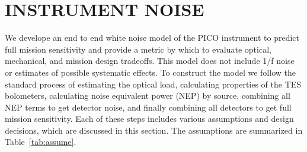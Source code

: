 \documentclass[]{spie}  %
\newcommand{\comr}[1]{\textcolor{red}{#1}}
\begin{document}





\section{INSTRUMENT NOISE}
\label{sec:noise}

We develope an end to end white noise model of the PICO instrument to predict full mission sensitivity and 
provide a metric by which to evaluate optical, mechanical, and mission design tradeoffs.  This model does not include 
1/f noise or estimates of possible systematic effects.  %
To construct the model we follow the standard process\cite{suzuki2013_thesis,aubin2013_thesis} of estimating the 
optical load, calculating properties of the TES bolometers, calculating noise equivalent power (NEP) by source, 
combining all NEP terms to get detector noise, and finally combining all detectors to get full mission sensitivity.  
Each of these steps includes various assumptions and design decisions, 
which are discussed in this section.  The assumptions are summarized in Table~\ref{tab:assume}.
\end{document}
